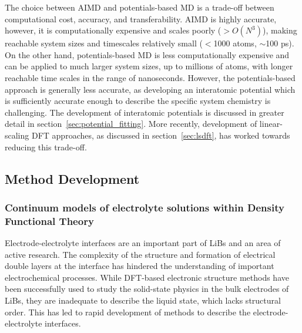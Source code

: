 \documentclass[../main.tex]{subfiles}
\begin{document}
The choice between AIMD and potentials-based MD is a trade-off between computational cost, accuracy, and transferability. AIMD is highly accurate, however, it is computationally expensive and scales poorly ($>O(N^3)$), making reachable system sizes and timescales relatively small ($<$1000 atoms, $\sim$100 ps). On the other hand, potentials-based MD is less computationally expensive and can be applied to much larger system sizes, up to millions of atoms, with longer reachable time scales in the range of nanoseconds. However, the potentials-based approach is generally less accurate, as developing an interatomic potential which is sufficiently accurate enough to describe the specific system chemistry is challenging. The development of interatomic potentials is discussed in greater detail in section~\ref{sec:potential_fitting}. More recently, development of linear-scaling DFT approaches, as discussed in section~\ref{sec:lsdft}, has worked towards reducing this trade-off.

\subsection{Method Development}

\subsubsection{Continuum models of electrolyte solutions within Density Functional Theory}
\label{sec:dft+cont}
Electrode-electrolyte interfaces are an important part of LiBs and an area of active research.\cite{Gauthier2015, yu2018electrode} The complexity of the structure and formation of electrical double layers at the interface has hindered the understanding of important electrochemical processes. While DFT-based electronic structure methods have been successfully used to study the solid-state physics in the bulk electrodes of LiBs, they are inadequate to describe the liquid state, which lacks structural order. This has led to rapid development of methods to describe the electrode-electrolyte interfaces.\cite{Jinnouchi2018} 
\end{document}
